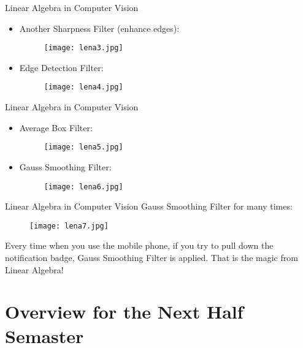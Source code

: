 \documentclass{beamer}
\begin{document}
\begin{frame}{Linear Algebra in Computer Vision}
    \begin{itemize}
        \item Another Sharpness Filter (enhance edges):
        \begin{figure}
            \centering
            \texttt{[image: lena3.jpg]}
        \end{figure}
        \item Edge Detection Filter:
        \begin{figure}
            \centering
            \texttt{[image: lena4.jpg]}
        \end{figure}
    \end{itemize}
\end{frame}

\begin{frame}{Linear Algebra in Computer Vision}
    \begin{itemize}
        \item Average Box Filter:
        \begin{figure}
            \centering
            \texttt{[image: lena5.jpg]}
        \end{figure}
        \item Gauss Smoothing Filter:
        \begin{figure}
            \centering
            \texttt{[image: lena6.jpg]}
        \end{figure}
    \end{itemize}
\end{frame}

\begin{frame}{Linear Algebra in Computer Vision}
Gauss Smoothing Filter for many times:
        \begin{figure}
            \centering
            \texttt{[image: lena7.jpg]}
        \end{figure}
        Every time when you use the mobile phone, if you try to pull down the notification badge, Gauss Smoothing Filter is applied. That is the magic from Linear Algebra!
\end{frame}

\section{Overview for the Next Half Semaster}
\end{document}
